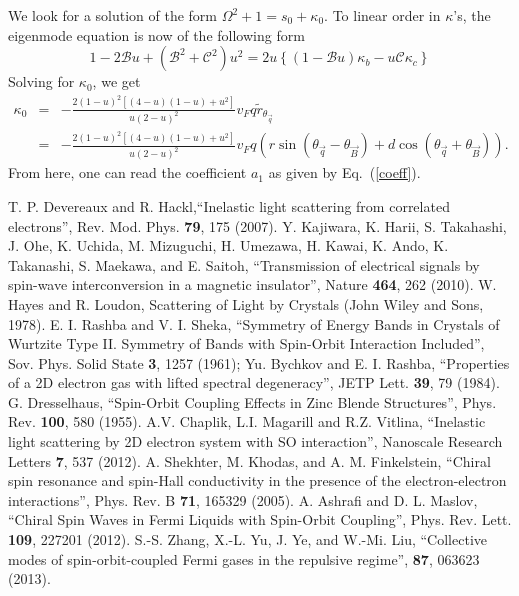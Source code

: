\documentclass[prb,aps,twocolumn]{revtex4}
\newcommand{\beq}{\begin{equation}}
\newcommand{\eeq}{\end{equation}}
\newcommand{\bea}{\begin{eqnarray}}
\newcommand{\eea}{\end{eqnarray}}
\newcommand{\bq}{{\vec q}}
\newcommand{\bB}{{\vec B}}
\begin{document}
\begin{widetext}
We look for a solution of the form $\Omega^2+1=s_0+\kappa_0$. To
linear order in $\kappa$'s, the eigenmode equation is now of the
{following} form \beq\label{eq:modd}
1-2\mathcal{B}u+(\mathcal{B}^2+\mathcal{C}^2)u^2=2u\left\{(1-\mathcal{B}u)\kappa_b-
u\mathcal{C} \kappa_c\right\} \eeq Solving for $\kappa_0$, we get
\bea\label{eq:soll}
\kappa_0&=&-\frac{2(1-u)^2[(4-u)(1-u)+u^2]}{u(2-u)^2}v_Fq\tilde r_{\theta_\bq}\nonumber\\
&=&-\frac{2(1-u)^2[(4-u)(1-u)+u^2]}{u(2-u)^2}v_Fq
\left(r\sin(\theta_{\bq}-\theta_\bB)+d\cos(\theta_{\bq}+\theta_\bB)\right).
\eea From here, one can read the coefficient $a_1$ as given by
Eq.~(\ref{coeff}).
\end{widetext}


\begin{thebibliography}{10}
 T. P. Devereaux and R. Hackl,``Inelastic light scattering from correlated electrons'',  Rev. Mod. Phys. {\bf 79}, 175 (2007).
 Y. Kajiwara, K. Harii, S. Takahashi, J. Ohe, K. Uchida, M. Mizuguchi, H. Umezawa, H. Kawai, K. Ando, K. Takanashi, S. Maekawa, and E. Saitoh, ``Transmission of electrical signals by spin-wave interconversion in a magnetic insulator'', Nature \textbf{464}, 262 (2010).
 W. Hayes and R. Loudon, Scattering of Light by Crystals (John Wiley and Sons, 1978).
 E. I. Rashba and V. I. Sheka, ``Symmetry of Energy Bands in Crystals of Wurtzite Type II. Symmetry of Bands with Spin-Orbit Interaction Included'',
Sov. Phys. Solid State {\bf 3}, 1257 (1961); Yu. Bychkov and E. I. Rashba, ``Properties of a 2D electron gas with lifted spectral degeneracy'', JETP Lett. {\bf 39}, 79 (1984).
 G. Dresselhaus, ``Spin-Orbit Coupling Effects in Zinc Blende Structures'', Phys. Rev. {\bf 100}, 580 (1955).
 A.V. Chaplik, L.I. Magarill and R.Z. Vitlina, ``Inelastic light scattering by 2D electron system with SO interaction'', Nanoscale Research Letters \textbf{7}, 537 (2012).
 A. Shekhter, M. Khodas, and A. M. Finkelstein, ``Chiral spin resonance and spin-Hall conductivity in the presence of the electron-electron interactions'', Phys. Rev. B \textbf{71}, 165329 (2005).
A. Ashrafi and D. L. Maslov, ``Chiral Spin Waves in Fermi Liquids with Spin-Orbit Coupling'', Phys. Rev. Lett. \textbf{109}, 227201 (2012).
 S.-S. Zhang, X.-L. Yu, J. Ye, and W.-Mi. Liu, ``Collective modes of spin-orbit-coupled Fermi gases in the repulsive regime'', \pra \textbf{87}, 063623 (2013).

\end{thebibliography}
\end{document}
